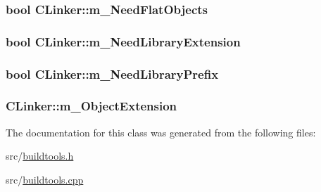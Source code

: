 \hypertarget{classCLinker_abf55c8a0d374129e983314f6ea492455}{
\subsubsection[{m\-\_\-\-Need\-Flat\-Objects}]{\setlength{\rightskip}{0pt plus 5cm}bool C\-Linker\-::m\-\_\-\-Need\-Flat\-Objects\hspace{0.3cm}{\ttfamily [protected]}}}\label{classCLinker_abf55c8a0d374129e983314f6ea492455}
\hypertarget{classCLinker_ac699e22d086ddbb74d39a381a55f0cfb}{
\subsubsection[{m\-\_\-\-Need\-Library\-Extension}]{\setlength{\rightskip}{0pt plus 5cm}bool C\-Linker\-::m\-\_\-\-Need\-Library\-Extension\hspace{0.3cm}{\ttfamily [protected]}}}\label{classCLinker_ac699e22d086ddbb74d39a381a55f0cfb}
\hypertarget{classCLinker_a2d18d1f275583edaf51929171e91189c}{
\subsubsection[{m\-\_\-\-Need\-Library\-Prefix}]{\setlength{\rightskip}{0pt plus 5cm}bool C\-Linker\-::m\-\_\-\-Need\-Library\-Prefix\hspace{0.3cm}{\ttfamily [protected]}}}\label{classCLinker_a2d18d1f275583edaf51929171e91189c}
\hypertarget{classCLinker_ae5945cfa69ae9ffd27fb7a41f618cbb8}{
\subsubsection[{m\-\_\-\-Object\-Extension}]{ C\-Linker\-::m\-\_\-\-Object\-Extension\hspace{0.3cm}{\ttfamily [protected]}}}\label{classCLinker_ae5945cfa69ae9ffd27fb7a41f618cbb8}


The documentation for this class was generated from the following files\-:\begin{DoxyCompactItemize}
\item 
src/\hyperlink{buildtools_8h}{buildtools.\-h}\item 
src/\hyperlink{buildtools_8cpp}{buildtools.\-cpp}\end{DoxyCompactItemize}
